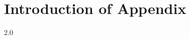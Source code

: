 
\begin{appendices}
\label{cha:appendices}

\chapter{Introduction of Appendix}
\begin{spacing}{2.0}


\end{spacing}


\end{appendices}